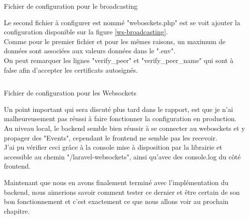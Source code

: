 \documentclass[
    iai, %
    il, %
]{heig-tb}
\begin{document}
\begin{listing}[h]
    \inputminted{php}{assets/code/broadcasting.php}
    \caption{Fichier de configuration pour le broadcasting \label{ws-broadcasting}}
\end{listing}

Le second fichier à configurer est nommé "webosckets.php" est se voit ajouter la configuration disponible sur la figure \ref{ws-broadcasting}. \\
Comme pour le premier fichier et pour les mêmes raisons, un maximum de données sont associées aux valeurs données dans le ".env". \\
On peut remarquer les lignes "verify_peer" et "verify_peer_name" qui sont à false afin d'accepter les certificats autosignés.

\begin{listing}[h]
    \inputminted{php}{assets/code/websockets.php}
    \caption{Fichier de configuration pour les Websockets \label{ws-websockets}}
\end{listing}

Un point important qui sera discuté plus tard dans le rapport, est que je n'ai malheureusement pas réussi à faire fonctionner la configuration en production. \\
Au niveau local, le  \Gls{backend} semble bien réussir à se connecter au webosckets et y propager des "Events", cependant le \Gls{frontend} ne semble pas les recevoir. \\
J'ai pu vérifier ceci grâce à la console mise à disposition par la librairie et accessible au chemin "/laravel-websockets", ainsi qu'avec des console.log du côté \Gls{frontend}.

Maintenant que nous en avons finalement terminé avec l'implémentation du \Gls{backend}, nous aimerions savoir comment tester ce dernier et être certain de son bon fonctionnement et c'est exactement ce que nous allons voir au prochain chapitre.





\end{document}
